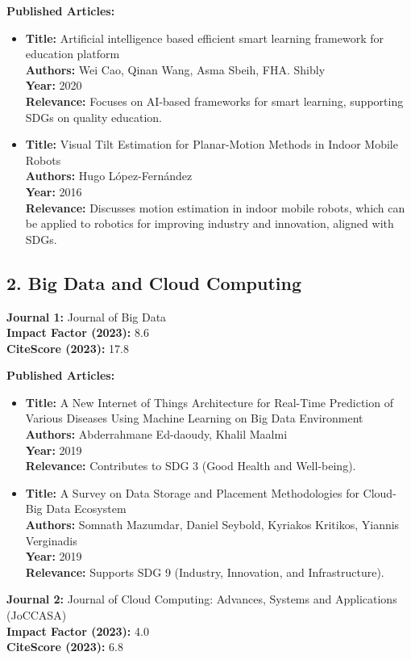 \documentclass[11pt]{article}
\begin{document}
\textbf{Published Articles:}
\begin{itemize}
    \item \textbf{Title:} Artificial intelligence based efficient smart learning framework for education platform \\
    \textbf{Authors:} Wei Cao, Qinan Wang, Asma Sbeih, FHA. Shibly \\
    \textbf{Year:} 2020 \\
    \textbf{Relevance:}  Focuses on AI-based frameworks for smart learning, supporting SDGs on quality education.

    \item \textbf{Title:} Visual Tilt Estimation for Planar-Motion Methods in Indoor Mobile Robots \\
    \textbf{Authors:} Hugo López-Fernández \\
    \textbf{Year:} 2016\\
    \textbf{Relevance:} Discusses motion estimation in indoor mobile robots, which can be applied to robotics for improving industry and innovation, aligned with SDGs.
\end{itemize}
\newpage
\subsection*{2. Big Data and Cloud Computing}

\textbf{Journal 1:} Journal of Big Data \\
\textbf{Impact Factor (2023):} 8.6 \\
\textbf{CiteScore (2023):} 17.8

\textbf{Published Articles:}
\begin{itemize}
    \item \textbf{Title:} A New Internet of Things Architecture for Real-Time Prediction of Various Diseases Using Machine Learning on Big Data Environment \\
    \textbf{Authors:} Abderrahmane Ed-daoudy, Khalil Maalmi \\
    \textbf{Year:} 2019 \\
    \textbf{Relevance:} Contributes to SDG 3 (Good Health and Well-being).

    \item \textbf{Title:} A Survey on Data Storage and Placement Methodologies for Cloud-Big Data Ecosystem \\
    \textbf{Authors:} Somnath Mazumdar, Daniel Seybold, Kyriakos Kritikos, Yiannis Verginadis \\
    \textbf{Year:} 2019 \\
    \textbf{Relevance:} Supports SDG 9 (Industry, Innovation, and Infrastructure).
\end{itemize}
\noindent \textbf{Journal 2:} Journal of Cloud Computing: Advances, Systems and Applications (JoCCASA) \\
\textbf{Impact Factor (2023):} 4.0 \\
\textbf{CiteScore (2023):} 6.8
\end{document}
